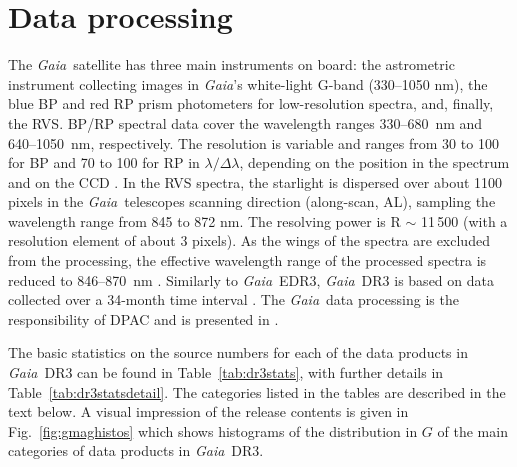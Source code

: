 \documentclass[longauth]{aa}
\providecommand{\bprp}{BP/RP\xspace}
\providecommand\gmag{\ensuremath{G}\xspace}
\newcommand\gaia{\textit{Gaia}\xspace}
\providecommand\gedrthree{\textit{Gaia}~EDR3\xspace}
\providecommand\gdr[1]{\textit{Gaia}~DR#1\xspace}
\providecommand\figref[1]{Fig.~\ref{#1}}
\providecommand\tabref[1]{Table~\ref{#1}}
\begin{document}
\section{Data processing}
\label{sec:dataprocessing}
The \gaia\ satellite has three main instruments on board: the astrometric instrument collecting images in \gaia’s white-light G-band (330–1050 nm), the blue BP and red RP prism photometers for low-resolution spectra, and, finally, the RVS. \bprp spectral data cover the wavelength ranges 330--680~nm and 640--1050~nm, respectively. The resolution is variable and ranges from 30 to 100 for BP and 70 to 100 for RP in $\lambda/{\Delta\lambda}$, depending on the position in the spectrum and on the CCD \citep[see][]{EDR3-DPACP-119}.   %
In the RVS spectra, the starlight is dispersed over about 1100
pixels in the \gaia\ telescopes scanning direction (along-scan, AL), sampling the wavelength
range from 845 to 872 nm. The resolving power is R $\sim$ 11\,500
(with a resolution element of about 3 pixels). As the wings of the spectra are excluded from the processing, the effective wavelength range of
the processed spectra is reduced to 846--870~nm \citep{CU6-DR3-documentation}. %
Similarly to \gedrthree, \gdr{3} is based on data collected over a 34-month time interval \citep[for details see][]{EDR3-DPACP-130}.
The \gaia\ data processing is the responsibility  of DPAC and is presented in \citet{DR1-DPACP-18}.

The basic statistics on the source numbers for each of the data products in \gdr{3} can be found in \tabref{tab:dr3stats}, with further details in \tabref{tab:dr3statsdetail}.  The categories listed in the tables are
described in the text below. A visual impression of the release contents is given in \figref{fig:gmaghistos} which shows histograms of the distribution in \gmag of the main categories of data products in \gdr{3}.
\end{document}
